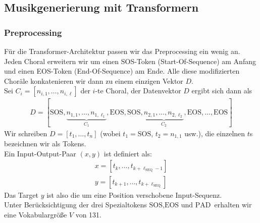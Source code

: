 

\subsection{Musikgenerierung mit Transformern}

\subsubsection{Preprocessing}
Für die Transformer-Architektur passen wir das Preprocessing ein wenig an. \\
Jeden Choral erweitern wir um einen SOS-Token (Start-Of-Sequence) am Anfang und einen EOS-Token (End-Of-Sequence)
am Ende. Alle diese modifizierten Choräle konkatenieren wir dann zu einem einzigen Vektor $D$. \\
Sei $C_i = [n_{i,1}, \dots, n_{i, \ell}]$ der $i$-te Choral, der Datenvektor $D$ ergibt sich dann als
\begin{align*}
    D = [\text{SOS}, \underbrace{n_{1, 1}, \dots, n_{1, \ell_1}}_{C_1}, \text{EOS}, 
    \text{SOS}, \underbrace{n_{2, 1}, \dots, n_{2, \ell_2}}_{C_2}, \text{EOS}, \dots, \text{EOS}]
\end{align*} 
Wir schreiben $D=[t_1, \dots, t_n]$ (wobei $t_1 = \text{SOS}$, $t_2 = n_{1,1}$ usw.), die einzelnen $t$s 
bezeichnen wir als Tokens. \\
Ein Input-Output-Paar $(x,y)$ ist definiert als:
\begin{align*}
    x = [t_k, \dots, t_{k+\ell_{\text{SEQ}}-1}] \\
    y = [t_{k+1}, \dots, t_{k+\ell_{\text{SEQ}}}]
\end{align*}
Das Target $y$ ist also die um eine Position verschobene Input-Sequenz. \\
Unter Berücksichtigung der drei Spezialtokens $\text{SOS}, \text{EOS} \text{ und } \text{PAD}$ erhalten wir eine 
Vokabulargröße $V$ von 131.

